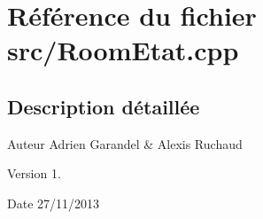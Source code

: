 \section{Référence du fichier src/\-Room\-Etat.cpp}
\label{_room_etat_8cpp}


\subsection{Description détaillée}
\begin{DoxyAuthor}{Auteur}
Adrien Garandel \& Alexis Ruchaud 
\end{DoxyAuthor}
\begin{DoxyVersion}{Version}
1. 
\end{DoxyVersion}
\begin{DoxyDate}{Date}
27/11/2013 
\end{DoxyDate}
